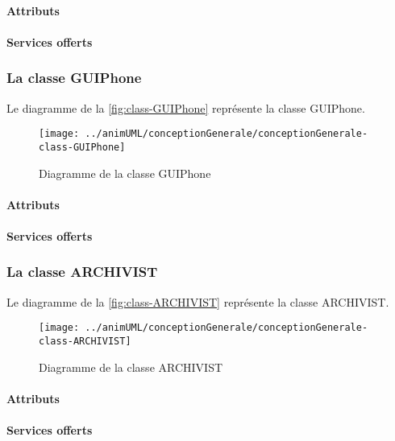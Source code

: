 \paragraph{Attributs}
\classUSERProperties
\paragraph{Services offerts}
\classUSEROperations
\subsubsection{La classe GUIPhone}

Le diagramme de la \autoref{fig:class-GUIPhone} représente la classe GUIPhone.
\begin{figure}[H]
	\centering
	\texttt{[image: ../animUML/conceptionGenerale/conceptionGenerale-class-GUIPhone]}
	\caption{Diagramme de la classe GUIPhone}
	\label{fig:class-GUIPhone}
\end{figure}


\paragraph{Attributs}
\classGUIPhoneProperties
\paragraph{Services offerts}
\classGUIPhoneOperations
\subsubsection{La classe ARCHIVIST}

Le diagramme de la \autoref{fig:class-ARCHIVIST} représente la classe ARCHIVIST.
\begin{figure}[H]
	\centering
	\texttt{[image: ../animUML/conceptionGenerale/conceptionGenerale-class-ARCHIVIST]}
	\caption{Diagramme de la classe ARCHIVIST}
	\label{fig:class-ARCHIVIST}
\end{figure}


\paragraph{Attributs}
\classARCHIVISTProperties
\paragraph{Services offerts}
\classARCHIVISTOperations
